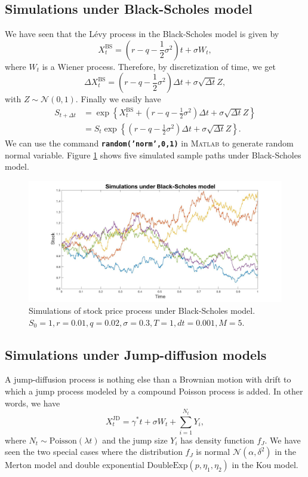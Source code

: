 \subsection{Simulations under Black-Scholes model}
We have seen that the L\'evy process in the Black-Scholes model is given by
$$X_t^\text{BS} = \left(r-q-\frac{1}{2}\sigma^2\right)t +\sigma W_t,$$
where $W_t$ is a Wiener process. Therefore, by discretization of time, we get
$$\Delta X_t^\text{BS}=\left(r-q-\frac{1}{2}\sigma^2\right)\Delta t+\sigma \sqrt{\Delta t}Z,$$
with $Z\sim\mathcal{N}(0,1)$. Finally we easily have
\begin{align*}
S_{t+\Delta t} &= \exp\left\{X_t^\text{BS}+\left(r-q-\frac{1}{2}\sigma^2\right)\Delta t+\sigma\sqrt{\Delta t}Z\right\}\\
&= S_t\exp\left\{\left(r-q-\frac{1}{2}\sigma^2\right)\Delta t+\sigma\sqrt{\Delta t}Z\right\}.
\end{align*}
We can use the command \textbf{\texttt{random('norm',0,1)}} in \textsc{Matlab} to generate random normal variable. Figure \ref{fig:MC:BS} shows five simulated sample paths under Black-Scholes model.
\begin{figure}[!htb]
	\includegraphics[width=\textwidth]{gfx/BS_plot}
	\caption{Simulations of stock price process under Black-Scholes model.\\ $S_0=1, r= 0.01,q = 0.02, \sigma=0.3, T = 1, dt = 0.001, M=5$.}
	\label{fig:MC:BS}
\end{figure}

\subsection{Simulations under Jump-diffusion models}
A jump-diffusion process is nothing else than a Brownian motion with drift to which a jump process modeled by a compound Poisson process is added. In other words, we have
$$X_t^\text{JD} = \gamma^\ast t + \sigma W_t + \sum_{i=1}^{N_t}Y_i,$$
where $N_t\sim\text{Poisson}(\lambda t)$ and the jump size $Y_i$ has density function $f_J$. We have seen the two special cases where the distribution $f_J$ is normal $\mathcal{N}(\alpha,\delta^2)$ in the Merton model and double exponential $\text{DoubleExp}(p,\eta_1,\eta_2)$ in the Kou model.

